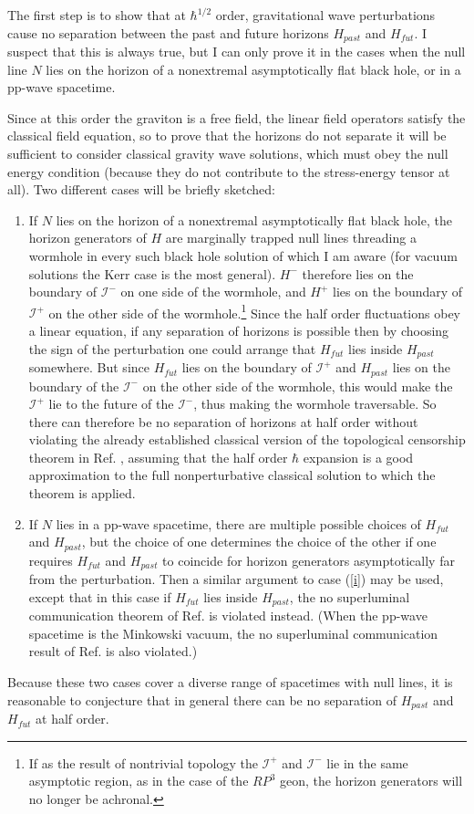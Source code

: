 \documentclass[11pt]{article}
\begin{document}
The first step is to show that at $\hbar^{1/2}$ order, gravitational wave perturbations cause no separation between the past and future horizons $H_{past}$ and $H_{fut}$.  I suspect that this is always true, but I can only prove it in the cases when the null line $N$ lies on the horizon of a nonextremal asymptotically flat black hole, or in a pp-wave spacetime.

Since at this order the graviton is a free field, the linear field operators satisfy the classical field equation, so to prove that the horizons do not separate it will be sufficient to consider classical gravity wave solutions, which must obey the null energy condition (because they do not contribute to the stress-energy tensor at all).  Two different cases will be briefly sketched:
\begin{enumerate}
\item \label{i} If $N$ lies on the horizon of a nonextremal asymptotically flat black hole, the horizon generators of $H$ are marginally trapped null lines threading a wormhole in every such black hole solution of which I am aware (for vacuum solutions the Kerr case is the most general).  $H^-$ therefore lies on the boundary of $\mathcal{I}^-$ on one side of the wormhole, and $H^+$ lies on the boundary of $\mathcal{I}^+$ on the other side of the wormhole.\footnote{If as the result of nontrivial topology the $\mathcal{I}^+$ and $\mathcal{I}^-$ lie in the same asymptotic region, as in the case of the $RP^3$ geon, the horizon generators will no longer be achronal.}  Since the half order fluctuations obey a linear equation, if any separation of horizons is possible then by choosing the sign of the perturbation one could arrange that $H_{fut}$ lies inside $H_{past}$ somewhere.  But since $H_{fut}$ lies on the boundary of $\mathcal{I}^+$ and $H_{past}$ lies on the boundary of the $\mathcal{I}^-$ on the other side of the wormhole, this would make the $\mathcal{I}^+$ lie to the future of the $\mathcal{I}^-$, thus making the wormhole traversable.  So there can therefore be no separation of horizons at half order without violating the already established classical version of the topological censorship theorem in Ref. \cite{FSW93}, assuming that the half order $\hbar$ expansion is a good approximation to the full nonperturbative classical solution to which the theorem is applied.

\item If $N$ lies in a pp-wave spacetime, there are multiple possible choices of $H_{fut}$ and $H_{past}$, but the choice of one determines the choice of the other if one requires $H_{fut}$ and $H_{past}$ to coincide for horizon generators asymptotically far from the perturbation.  Then a similar argument to case (\ref{i}) may be used, except that in this case if $H_{fut}$ lies inside $H_{past}$, the no superluminal communication theorem of Ref. \cite{olum98} is violated instead.  (When the pp-wave spacetime is the Minkowski vacuum, the no superluminal communication result of Ref. \cite{VBL99} is also violated.)
\end{enumerate}
Because these two cases cover a diverse range of spacetimes with null lines, it is reasonable to conjecture that in general there can be no separation of $H_{past}$ and $H_{fut}$ at half order.
\end{document}

